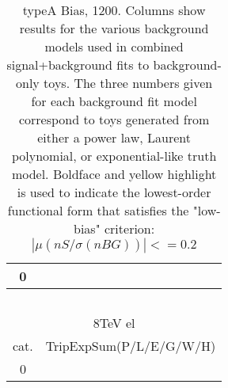 \documentclass[11pt,final]{article}
\begin{document}
\begin{landscape}
\begin{table}[htb]
\begin{center}
{\begin{tabular}{|c|c|}
  \hline 
  0 & \cellcolor{Yellow}{\bf -0.00 \slash -0.02 \slash -0.01 \slash -0.04 \slash 0.06 \slash -0.01} \\ 
  \hline 
  \multicolumn{2}{c}{~} \\ 
  \hline 
  \multicolumn{2}{|c|}{8TeV el} \\ 
  \hline 
  cat. & TripExpSum(P/L/E/G/W/H) \\ 
  \hline 
  0 & \cellcolor{Yellow}{\bf -0.01 \slash -0.03 \slash -0.02 \slash 0.03 \slash 0.03 \slash -0.03} \\ 
  \hline 
  \end{tabular}%
  }
 \caption{typeA Bias, 1200.  Columns show results for the various background models used in combined signal+background fits to background-only toys.  The three numbers given for each background fit model correspond to toys generated from either a power law, Laurent polynomial, or exponential-like truth model.  Boldface and yellow highlight is used to indicate the lowest-order functional form that satisfies the "low-bias" criterion: $|\mu(nS/\sigma(nBG))|<=0.2$  }
 \label{tab:pull}
 \end{center}
\end{table}
\end{landscape}
\end{document}
